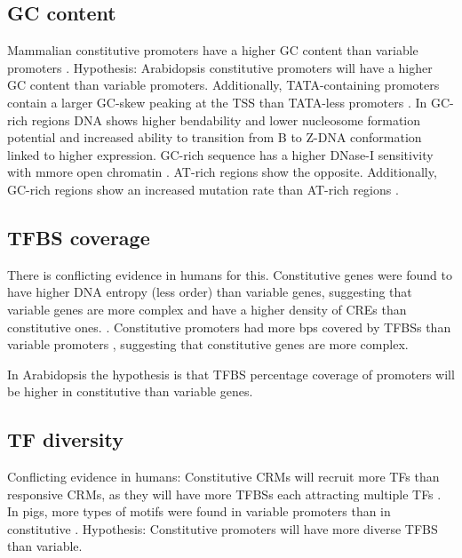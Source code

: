 \documentclass[../main.tex]{subfiles}
\begin{document}
\subsection{GC content}
\label{chapter1:introduction:gc-content}
Mammalian constitutive promoters have a higher GC content than variable promoters \autocite{vinogradovDNAHelixImportance2017,weiCharacterizationGenePromoters2019}.
Hypothesis: Arabidopsis constitutive promoters will have a higher GC content than variable promoters.
Additionally, TATA-containing promoters contain a larger GC-skew peaking at the TSS than TATA-less promoters \autocite{zuoIdentificationTATATATAless2011}.
In GC-rich regions DNA shows higher bendability \autocite{vinogradovBendableGenesWarmblooded2001,vinogradovDNAHelixImportance2003} and lower nucleosome formation potential \autocite{vinogradovNoncodingDNAIsochores2005} and increased ability to transition from B to Z-DNA conformation \autocite{vinogradovDNAHelixImportance2003} linked to higher expression.  GC-rich sequence has a higher DNase-I sensitivity with mmore open chromatin \autocite{difilippoMappingDNaseIHypersensitive2008}.
AT-rich regions show the opposite.
Additionally, GC-rich regions show an increased mutation rate than AT-rich regions \autocite{vinogradovDNAHelixImportance2017}.
\subsection{TFBS coverage}
\label{chapter1:introduction:tfbs-coverage}
There is conflicting evidence in humans for this.
Constitutive genes were found to have higher DNA entropy (less order) than variable genes, suggesting that variable genes are more complex and have a higher density of CREs than constitutive ones. \autocite{thomasDNAEntropyReveals2015}. 
Constitutive promoters had more bps covered by TFBSs than variable promoters \autocite{mattioliHighthroughputFunctionalAnalysis2019}, suggesting that constitutive genes are more complex.

In Arabidopsis the hypothesis is that TFBS percentage coverage of promoters will be higher in constitutive than variable genes.

\subsection{TF diversity}
\label{chapter1:introduction:tf-diversity}
Conflicting evidence in humans:
Constitutive CRMs will recruit more TFs than responsive CRMs, as they will have more TFBSs each attracting multiple TFs \autocite{mattioliHighthroughputFunctionalAnalysis2019}.
In pigs, more types of motifs were found in variable promoters than in constitutive \autocite{weiCharacterizationGenePromoters2019}.
Hypothesis: Constitutive promoters will have more diverse TFBS than variable.
\end{document}
